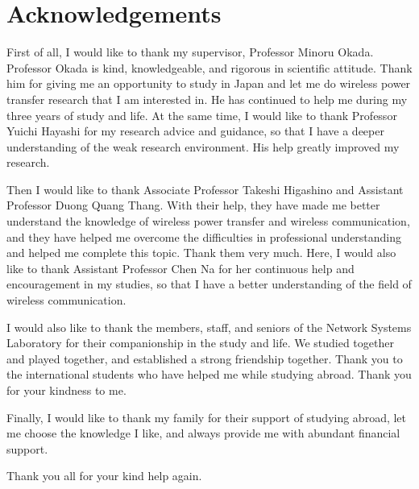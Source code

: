 \chapter*{Acknowledgements}

First of all, I would like to thank my supervisor, Professor Minoru Okada. Professor Okada is kind, knowledgeable, and rigorous in scientific attitude. Thank him for giving me an opportunity to study in Japan and let me do wireless power transfer research that I am interested in. He has continued to help me during my three years of study and life. At the same time, I would like to thank Professor Yuichi Hayashi for my research advice and guidance, so that I have a deeper understanding of the weak research environment. His help greatly improved my research.

Then I would like to thank Associate Professor Takeshi Higashino and Assistant Professor Duong Quang Thang. With their help, they have made me better understand the knowledge of wireless power transfer and wireless communication, and they have helped me overcome the difficulties in professional understanding and helped me complete this topic. Thank them very much. Here, I would also like to thank Assistant Professor Chen Na for her continuous help and encouragement in my studies, so that I have a better understanding of the field of wireless communication.

I would also like to thank the members, staff, and seniors of the Network Systems Laboratory for their companionship in the study and life. We studied together and played together, and established a strong friendship together. Thank you to the international students who have helped me while studying abroad. Thank you for your kindness to me.

Finally, I would like to thank my family for their support of studying abroad, let me choose the knowledge I like, and always provide me with abundant financial support.

Thank you all for your kind help again.